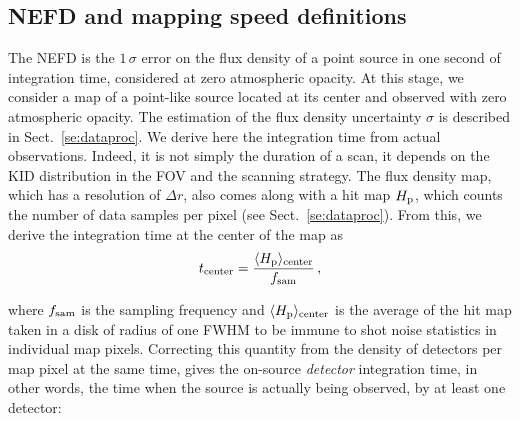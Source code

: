 \subsection{NEFD and mapping speed definitions}
\label{se:integration_time}

The NEFD is the $1\,\sigma$ error on the flux
density of a point source in one second of integration time,
considered at zero atmospheric opacity.
At this stage, we consider a map of a point-like source located at its
center and observed with zero atmospheric opacity. The estimation of
the flux density uncertainty $\sigma$ is described in Sect.~\ref{se:dataproc}.
We derive here the integration time from actual observations. Indeed,
it is not simply the duration of a scan, it depends on the KID
distribution in the FOV and the scanning strategy.
The flux density map, which has a resolution of $\Delta r$, also comes
along with a hit map $H_{\rm{p}}$, which counts the number of
data samples per pixel (see Sect.~\ref{se:dataproc}).
From this, we derive the integration time at the center
of the map as
%
%
\begin{equation}
t_{\rm{center}} = \frac{\langle H_{\rm{p}}\rangle_{\rm{center}}}{f_{\rm{sam}}}\,,
\end{equation}

where $f_{\rm{sam}}$ is the sampling frequency and $\langle
H_{\rm{p}}\rangle_{\rm{center}}$ is the average of the hit map taken in a disk
of radius of one FWHM to be immune to shot noise statistics in individual map
pixels. Correcting this quantity from the density of detectors per map pixel at
the same time, gives the on-source \emph{detector} integration time, in other
words, the time when the source is actually being observed, by at least one
detector:

